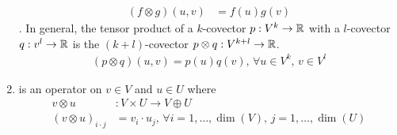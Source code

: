 \documentclass[10pt,a4paper]{report}
\begin{document}
\begin{enumerate}
	\begin{align*}
		(f \otimes g)(u,v) &= f(u)g(v)
	\end{align*}.  In general, the tensor product of a $k$-covector $p:V^k \to \mathbb{R}$ with a $l$-covector $q:v^l \to \mathbb{R}$ is the $(k+l)$-covector $p\otimes q: V^{k+l}\to \mathbb{R}$.
	\begin{align*}
		(p\otimes q)(u,v) = p(u)q(v),\,\forall u\in V^k,\, v\in V^l
	\end{align*}
	\item {} is an operator on $v \in V$ and $u \in U$ where 
	\begin{align*}
		v \otimes u &: V \times U \to V \oplus U \\
		(v \otimes u)_{i\cdot j} &= v_i \cdot u_j,\, \forall i=1,\dots,\dim(V),\, j=1,\dots,\dim(U)
	\end{align*}
	

\end{enumerate}
\end{document}
